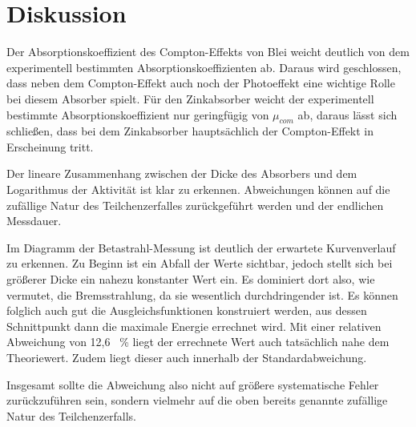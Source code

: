 \section{Diskussion}
\label{sec:Diskussion}

Der Absorptionskoeffizient des Compton-Effekts von Blei weicht deutlich von dem experimentell bestimmten Absorptionskoeffizienten ab.
Daraus wird geschlossen, dass neben dem Compton-Effekt auch noch der Photoeffekt eine wichtige Rolle bei diesem Absorber spielt. Für
den Zinkabsorber weicht der experimentell bestimmte Absorptionskoeffizient nur geringfügig von $\mu_{com}$ ab, daraus
lässt sich schließen, dass bei dem Zinkabsorber hauptsächlich der Compton-Effekt in Erscheinung tritt.

Der lineare Zusammenhang zwischen der Dicke des Absorbers und dem Logarithmus der Aktivität ist klar zu erkennen.
Abweichungen können auf die zufällige Natur des Teilchenzerfalles zurückgeführt werden und der endlichen Messdauer.

Im Diagramm der Betastrahl-Messung ist deutlich der erwartete Kurvenverlauf zu erkennen. Zu Beginn ist ein Abfall der
Werte sichtbar, jedoch stellt sich bei größerer Dicke ein nahezu konstanter Wert ein. Es dominiert dort also, wie vermutet, die Bremsstrahlung, da
sie wesentlich durchdringender ist. Es können folglich auch gut die Ausgleichsfunktionen konstruiert werden, aus dessen Schnittpunkt
dann die maximale Energie errechnet wird. Mit einer relativen Abweichung von 12,6 \, \% liegt der errechnete Wert auch tatsächlich nahe dem
Theoriewert. Zudem liegt dieser auch innerhalb der Standardabweichung.

Insgesamt sollte die Abweichung also nicht auf größere systematische Fehler zurückzuführen sein, sondern vielmehr auf die oben bereits genannte
zufällige Natur des Teilchenzerfalls.
